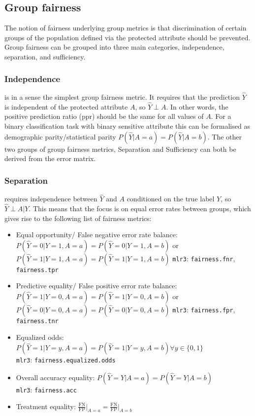 \subsection*{Group fairness}
The notion of fairness underlying group metrics is that discrimination of certain groups of the population defined via the protected attribute should be prevented. Group fairness can be grouped into three main categories, independence, separation, and sufficiency. 

\subsubsection*{Independence} is in a sense the simplest group fairness metric. It requires that the prediction $\hat{Y}$ is independent of the protected attribute $A$, so $\hat{Y} \perp A$. In other words, the positive prediction ratio (ppr) should be the same for all values of $A$. For a binary classification task with binary sensitive attribute this can be formalised as demographic parity/statistical parity $P(\hat{Y} | A = a) = P(\hat{Y} | A = b)$.
The other two groups of group fairness metrics, Separation and Sufficiency can both be derived from the error matrix.

\subsubsection{Separation} requires independence between $\hat{Y}$ and $A$ conditioned on the true label $Y$, so $\hat{Y} \perp A | Y$. This means that the focus is on equal error rates between groups, which gives rise to the following list of fairness metrics:
\begin{itemize}
    \item Equal opportunity/ False negative error rate balance: $P(\hat{Y} = 0 | Y = 1, A = a) = P(\hat{Y} = 0 | Y = 1, A = b)$ or $P(\hat{Y} = 1 | Y = 1, A = a) = P(\hat{Y} = 1 | Y = 1, A = b)$ \texttt{mlr3}: \texttt{fairness.fnr}, \texttt{fairness.tpr}
    \item Predictive equality/ False positive error rate balance: $P(\hat{Y} = 1 | Y = 0, A = a) = P(\hat{Y} = 1 | Y = 0, A = b)$ or \\ $P(\hat{Y} = 0 | Y = 0, A = a) = P(\hat{Y} = 0 | Y = 0, A = b)$ \texttt{mlr3}: \texttt{fairness.fpr}, \texttt{fairness.tnr}
    \item Equalized odds: $P(\hat{Y} = 1 | Y = y, A = a) = P(\hat{Y} = 1 | Y = y, A = b) \forall y \in \{0, 1\}$ \\ \texttt{mlr3}: \texttt{fairness.equalized.odds}
    \item Overall accuracy equality: $P(\hat{Y} = Y | A = a) = P(\hat{Y} = Y | A = b)$ \\ \texttt{mlr3}: \texttt{fairness.acc}
    \item Treatment equality: $\frac{\text{FN}}{\text{FP}} \big|_{A = a} = \frac{\text{FN}}{\text{FP}} \big|_{A = b}$
\end{itemize}

